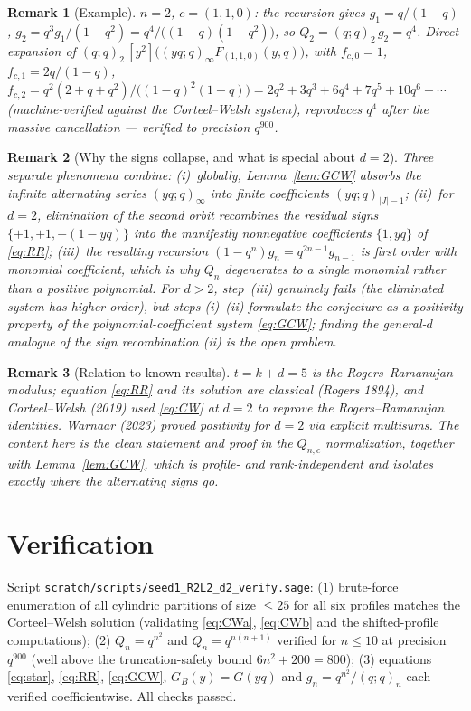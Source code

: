 \documentclass[11pt]{article}
\newtheorem{remark}{Remark}
\begin{document}
\begin{remark}[Example]
$n=2$, $c=(1,1,0)$: the recursion gives
$g_1=q/(1-q)$, $g_2=q^{3}g_1/(1-q^2)=q^{4}/\bigl((1-q)(1-q^2)\bigr)$, so
$Q_{2}=(q;q)_2\,g_2=q^{4}$. Direct expansion of
$(q;q)_2\,[y^2]\bigl((yq;q)_\infty F_{(1,1,0)}(y,q)\bigr)$, with
$f_{c,0}=1$, $f_{c,1}=2q/(1-q)$,
$f_{c,2}=q^2(2+q+q^2)/\bigl((1-q)^2(1+q)\bigr)
=2q^2+3q^3+6q^4+7q^5+10q^6+\cdots$
(machine-verified against the Corteel--Welsh system), reproduces $q^4$ after
the massive cancellation --- verified to precision $q^{900}$.
\end{remark}

\begin{remark}[Why the signs collapse, and what is special about $d=2$]
Three separate phenomena combine:
(i)~\emph{globally}, Lemma~\ref{lem:GCW} absorbs the infinite alternating
series $(yq;q)_\infty$ into finite coefficients $(yq;q)_{|J|-1}$;
(ii)~\emph{for $d=2$}, elimination of the second orbit recombines the residual
signs $\{+1,+1,-(1-yq)\}$ into the manifestly nonnegative coefficients
$\{1,yq\}$ of \eqref{eq:RR}; (iii)~the resulting recursion
$(1-q^n)g_n=q^{2n-1}g_{n-1}$ is first order with monomial coefficient, which
is why $Q_n$ degenerates to a single monomial rather than a positive
polynomial. For $d>2$, step~(iii) genuinely fails (the eliminated system has
higher order), but steps (i)--(ii) formulate the conjecture as a positivity
property of the polynomial-coefficient system \eqref{eq:GCW}; finding the
general-$d$ analogue of the sign recombination (ii) is the open problem.
\end{remark}

\begin{remark}[Relation to known results]
$t=k+d=5$ is the Rogers--Ramanujan modulus; equation \eqref{eq:RR} and its
solution are classical (Rogers 1894), and Corteel--Welsh (2019) used
\eqref{eq:CW} at $d=2$ to reprove the Rogers--Ramanujan identities. Warnaar
(2023) proved positivity for $d=2$ via explicit multisums. The content here is
the clean statement and proof in the $Q_{n,c}$ normalization, together with
Lemma~\ref{lem:GCW}, which is profile- and rank-independent and isolates
exactly where the alternating signs go.
\end{remark}

\section*{Verification}
Script \texttt{scratch/scripts/seed1\_R2L2\_d2\_verify.sage}: (1) brute-force
enumeration of all cylindric partitions of size $\le25$ for all six profiles
matches the Corteel--Welsh solution (validating \eqref{eq:CWa},
\eqref{eq:CWb} and the shifted-profile computations); (2) $Q_{n}=q^{n^2}$ and
$Q_n=q^{n(n+1)}$ verified for $n\le10$ at precision $q^{900}$ (well above the
truncation-safety bound $6n^2+200=800$); (3) equations \eqref{eq:star},
\eqref{eq:RR}, \eqref{eq:GCW}, $G_B(y)=G(yq)$ and $g_n=q^{n^2}/(q;q)_n$ each
verified coefficientwise. All checks passed.
\end{document}
